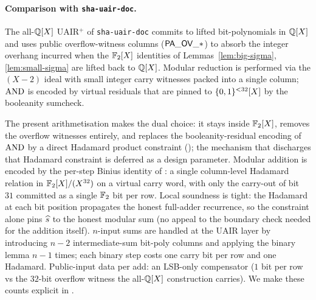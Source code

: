 \paragraph{Comparison with \texttt{sha-uair-doc}.}
The all-$\mathbb{Q}[X]$ UAIR$^+$ of \texttt{sha-uair-doc} commits to lifted
bit-polynomials in $\mathbb{Q}[X]$ and uses public overflow-witness columns
($\mathsf{PA\_OV\_*}$) to absorb the integer overhang incurred when the
$\mathbb{F}_2[X]$ identities of Lemmas~\ref{lem:big-sigma},
\ref{lem:small-sigma} are lifted back to $\mathbb{Q}[X]$. Modular reduction is
performed via the $(X-2)$ ideal with small integer carry witnesses
packed into a single column; $\operatorname{AND}$ is encoded by virtual residuals
that are pinned to $\{0,1\}^{<32}[X]$ by the booleanity sumcheck.

The present arithmetisation makes the dual choice: it stays inside
$\mathbb{F}_2[X]$, removes the overflow witnesses entirely, and replaces the
booleanity-residual encoding of $\operatorname{AND}$ by a direct Hadamard product
constraint (); the mechanism that discharges
that Hadamard constraint is deferred as a design parameter.
Modular addition is encoded by the per-step Binius identity of
: a single column-level Hadamard relation in
$\mathbb{F}_2[X]/(X^{32})$ on a virtual carry word, with only the carry-out of bit~$31$
committed as a single $\mathbb{F}_2$ bit per row. Local soundness is tight:
the Hadamard at each bit position propagates the honest full-adder
recurrence, so the constraint alone pins $\widehat{s}$ to the honest
modular sum (no appeal to the boundary check needed for the addition
itself). $n$-input sums are handled at the UAIR layer by introducing
$n - 2$ intermediate-sum bit-poly columns and applying the binary
lemma $n - 1$ times; each binary step costs one carry bit per row and
one Hadamard. Public-input data per add: an LSB-only compensator
($1$ bit per row vs the $32$-bit overflow witness the all-$\mathbb{Q}[X]$
construction carries). We make these counts explicit in
.
